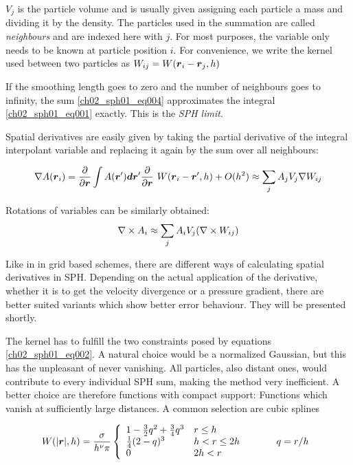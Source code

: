 $V_{j}$ is the particle volume and is usually given assigning each particle a mass and dividing it by the density. The particles used in the summation are called \emph{neighbours} and are indexed here with $j$. For most purposes, the variable only needs to be known at particle position $i$. For convenience, we write the kernel used between two particles as $W_{ij} = W( \boldsymbol{r}_{i} - \boldsymbol{r}_{j}, h)$

If the smoothing length goes to zero and the number of neighbours goes to infinity, the sum \ref{ch02_sph01_eq004} approximates the integral \ref{ch02_sph01_eq001} exactly. This is the \emph{SPH limit}.

Spatial derivatives are easily given by taking the partial derivative of the integral interpolant variable and replacing it again by the sum over all neighbours:

\begin{equation}
\label{ch02_sph01_eq005}
\nabla A(\boldsymbol{r}_i) = \frac{\partial}{\partial \boldsymbol{r}}\int A(\boldsymbol{r}') \boldsymbol{d} \boldsymbol{r}' \frac{\partial}{\partial \boldsymbol{r}}\ W(\boldsymbol{r}_i - \boldsymbol{r}', h) + O(h^2)
\approx \sum_{j} A_j V_{j} \nabla W_{ij} 
\end{equation}

Rotations of variables can be similarly obtained:
\begin{equation}
\label{ch02_sph01_eq006}
\nabla \times A_i \approx \sum_{j} A_i V_{j} (\nabla \times W_{ij})
\end{equation}

Like in in grid based schemes, there are different ways of calculating spatial derivatives in SPH.
Depending on the actual application of the derivative, whether it is to get the velocity divergence or a pressure gradient, there are better suited variants which show better error behaviour. They will be presented shortly.

The kernel has to fulfill the two constraints posed by equations \ref{ch02_sph01_eq002}. A natural choice would be a normalized Gaussian, but this has the unpleasant of never vanishing. All particles, also distant ones, would contribute to every individual SPH sum, making the method very inefficient. A better choice are therefore functions with compact support: Functions which vanish at sufficiently large distances. A common selection are cubic splines

\begin{equation}
\label{ch02_sph01_eq007}
W(| \boldsymbol{r} |, h) = \frac{\sigma}{h^\nu \pi} \left \{ \begin{array}{lll}
1 - \frac{3}{2}q^2 + \frac{3}{4}q^3 & r \leq h & \\
\frac{1}{4}(2-q)^3 & h < r  \leq 2h & \hspace{1.0cm} q = r / h\\
0 & 2h < r & \\
\end{array} \right. 
\end{equation}

